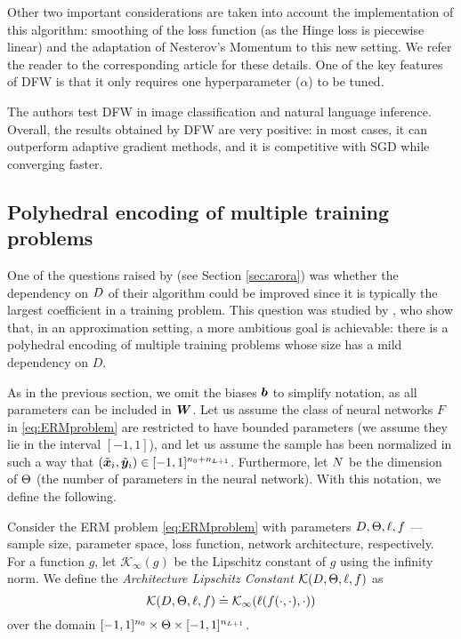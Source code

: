 Other two important considerations are taken into account the implementation of this algorithm: smoothing of the loss function (as the Hinge loss is piecewise linear) and the adaptation of Nesterov's Momentum to this new setting. We refer the reader to the corresponding article for these details. One of the key features of DFW is that it only requires one hyperparameter ($\alpha$) to be tuned.

The authors test DFW in image classification and natural language inference. Overall, the results obtained by DFW are very positive: in most cases, it can outperform adaptive gradient methods, and it is competitive with SGD while converging faster. 

\subsection{Polyhedral encoding of multiple training problems}

One of the questions raised by \cite{arora2018understanding} (see Section \ref{sec:arora}) was whether the dependency on $D$ of their algorithm could be improved since it is typically the largest coefficient in a training problem. This question was studied by \cite{TrainingLP}, who show that, in an approximation setting, a more ambitious goal is achievable: there is a polyhedral encoding of multiple training problems whose size has a mild dependency on $D$.

As in the previous section, we omit the biases ${\bm{b}}$ to simplify notation, as all parameters can be included in ${\bm{W}}$. Let us assume the class of neural networks $F$ in \eqref{eq:ERMproblem} are restricted to have bounded parameters (we assume they lie in the interval $[-1,1]$), and let us assume the sample has been normalized in such a way that $(\tilde{{\bm{x}}}_i, \tilde{{\bm{y}}}_i) \in [-1,1]^{{n_0}+{n_{L+1}}}$. Furthermore, let $N$ be the dimension of $\Theta$ (the number of parameters in the neural network). With this notation, we define the following.

\begin{definition}
Consider the ERM problem \eqref{eq:ERMproblem} with parameters $D, \Theta, \ell, f$ --- sample size, parameter space, loss function, network architecture, respectively. For a function $g$, let $\mathcal{K}_\infty(g)$ be the Lipschitz constant of $g$ using the infinity norm. We define the \emph{Architecture Lipschitz Constant} $\mathcal{K}(D,\Theta,\ell, f)$ as
\begin{equation}
    \label{eq:Lipschitz-Arch}
    \mathcal{K}(D,\Theta,\ell, f) \doteq \mathcal{K}_\infty(\ell(f(\cdot , \cdot), \cdot ))
\end{equation}
over the domain $[-1,1]^{n_0}  \times \Theta \times [-1,1]^{n_{L+1}}$.
\end{definition}

